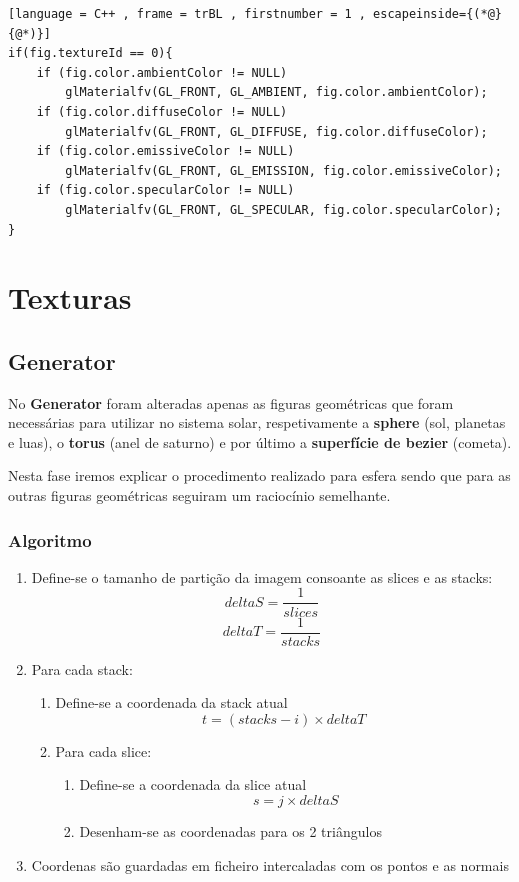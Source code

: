 \documentclass[a4paper]{article}
\begin{document}
\begin{lstlisting}[language = C++ , frame = trBL , firstnumber = 1 , escapeinside={(*@}{@*)}]
if(fig.textureId == 0){
	if (fig.color.ambientColor != NULL)
		glMaterialfv(GL_FRONT, GL_AMBIENT, fig.color.ambientColor);
	if (fig.color.diffuseColor != NULL)
		glMaterialfv(GL_FRONT, GL_DIFFUSE, fig.color.diffuseColor);
	if (fig.color.emissiveColor != NULL)
		glMaterialfv(GL_FRONT, GL_EMISSION, fig.color.emissiveColor);
	if (fig.color.specularColor != NULL)
		glMaterialfv(GL_FRONT, GL_SPECULAR, fig.color.specularColor);
}
\end{lstlisting}



\newpage
\section{Texturas}
\label{sec:texturas}

\subsection{Generator}
\label{sec:generatort}

No \textbf{Generator} foram alteradas apenas as figuras geométricas que foram necessárias para utilizar no sistema solar, respetivamente a \textbf{sphere} (sol, planetas e luas), o \textbf{torus} (anel de saturno) e por último a \textbf{superfície de bezier} (cometa).

Nesta fase iremos explicar o procedimento realizado para esfera sendo que para as outras figuras geométricas seguiram um raciocínio semelhante.

\subsubsection{Algoritmo}
\label{sec:algoritmot}

\ttfamily
\begin{enumerate}
  \item Define-se o tamanho de partição da imagem consoante as slices e as stacks:
   	$$deltaS = \frac{1}{slices}$$  $$deltaT = \frac{1}{stacks}$$
  \item Para cada stack:
  \begin{enumerate}
  	\item Define-se a coordenada da stack atual
	$$ t = (stacks - i) \times deltaT $$
	\item Para cada slice:
	\begin{enumerate}
	 	\item Define-se a coordenada da slice atual
		$$ s = j \times deltaS $$
		\item Desenham-se as coordenadas para os 2 triângulos
	\end{enumerate}
  \end{enumerate}
  \item Coordenas são guardadas em ficheiro intercaladas com os pontos e as normais
\end{enumerate}
\rmfamily
\end{document}
